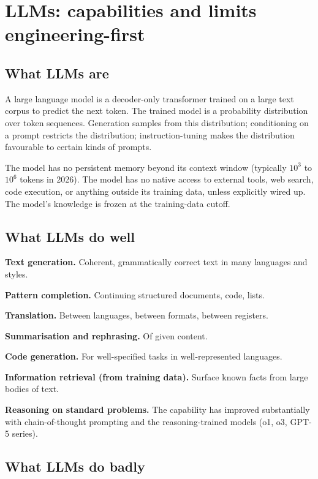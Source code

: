 \section{LLMs: capabilities and limits engineering-first}

\subsection{What LLMs are}

A large language model is a decoder-only transformer trained on a large text corpus to predict the next token. The trained model is a probability distribution over token sequences. Generation samples from this distribution; conditioning on a prompt restricts the distribution; instruction-tuning makes the distribution favourable to certain kinds of prompts.

The model has no persistent memory beyond its context window (typically $10^3$ to $10^6$ tokens in 2026). The model has no native access to external tools, web search, code execution, or anything outside its training data, unless explicitly wired up. The model's knowledge is frozen at the training-data cutoff.

\subsection{What LLMs do well}

\textbf{Text generation.} Coherent, grammatically correct text in many languages and styles.

\textbf{Pattern completion.} Continuing structured documents, code, lists.

\textbf{Translation.} Between languages, between formats, between registers.

\textbf{Summarisation and rephrasing.} Of given content.

\textbf{Code generation.} For well-specified tasks in well-represented languages.

\textbf{Information retrieval (from training data).} Surface known facts from large bodies of text.

\textbf{Reasoning on standard problems.} The capability has improved substantially with chain-of-thought prompting and the reasoning-trained models (o1, o3, GPT-5 series).

\subsection{What LLMs do badly}

